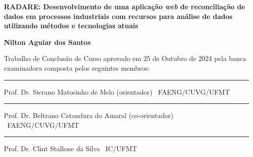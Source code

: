 %
%

\begin{titlepage}

\begin{center}

\LARGE

\textbf{RADARE: Desenvolvimento de uma aplicação \textit{web} de reconciliação de dados em processos industriais com recursos para análise de dados utilizando métodos e tecnologias atuais}

\vfill

\Large

\textbf{Nilton Aguiar dos Santos}

\end{center}

\vfill

\noindent
Trabalho de Conclusão de Curso
aprovado em 25 de Outubro de 2024 pela banca examinadora composta
pelos seguintes membros:

\begin{center}

\vspace{1.5cm}\rule{0.95\linewidth}{1pt}
\parbox{0.9\linewidth}{%
Prof. Dr. Sicrano Matosinho de Melo (orientador) \dotfill\ FAENG/CUVG/UFMT}

\vspace{1.5cm}\rule{0.95\linewidth}{1pt}
\parbox{0.9\linewidth}{%
Prof. Dr. Beltrano Catandura do Amaral (co-orientador) \dotfill\ FAENG/CUVG/UFMT}

\vspace{1.5cm}\rule{0.95\linewidth}{1pt}
\parbox{0.9\linewidth}{%
Prof. Dr. Clint Stallone da Silva \dotfill\ IC/UFMT}


\end{center}

\end{titlepage}

%
%


